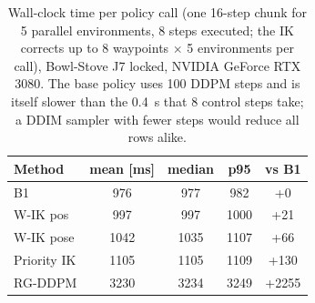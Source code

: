 \begin{table}[t]
\centering
\caption{Wall-clock time per policy call (one 16-step chunk for 5 parallel environments, 8 steps executed; the IK corrects up to 8 waypoints $\times$ 5 environments per call), Bowl-Stove J7 locked, NVIDIA GeForce RTX 3080. The base policy uses 100 DDPM steps and is itself slower than the 0.4~s that 8 control steps take; a DDIM sampler with fewer steps would reduce all rows alike.}
\label{tab:latency}
\setlength{\tabcolsep}{3pt}
\begin{tabular}{lcccc}
\toprule
Method & mean [ms] & median & p95 & vs B1 \\
\midrule
B1 & 976 & 977 & 982 & +0 \\
W-IK pos & 997 & 997 & 1000 & +21 \\
W-IK pose & 1042 & 1035 & 1107 & +66 \\
Priority IK & 1105 & 1105 & 1109 & +130 \\
RG-DDPM & 3230 & 3234 & 3249 & +2255 \\
\bottomrule
\end{tabular}
\end{table}

